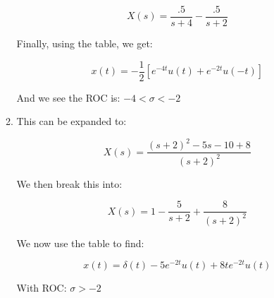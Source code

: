 \begin{enumerate}
\begin{enumerate}
        $$X(s)=\frac{.5}{s+4}-\frac{.5}{s+2}$$

        Finally, using the table, we get:

        $$\boxed{x(t)=-\frac{1}{2}\left[ e^{-4t}u(t)+e^{-2t}u(-t) \right]}$$

        And we see the ROC is: $\boxed{-4<\sigma<-2}$

      \item This can be expanded to:

        $$X(s)=\frac{(s+2)^2-5s-10+8}{(s+2)^2}$$

        We then break this into:

        $$X(s)=1-\frac{5}{s+2}+\frac{8}{(s+2)^2}$$

        We now use the table to find:

        $$\boxed{x(t)=\delta(t)-5e^{-2t}u(t)+8te^{-2t}u(t)}$$

        With ROC: $\boxed{\sigma>-2}$

    \end{enumerate}

\end{enumerate}



